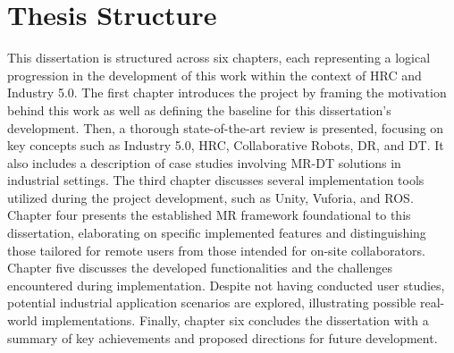 \section{Thesis Structure}
% 

This dissertation is structured across six chapters, each representing a logical progression in the development of this work within the context of \ac{HRC} and Industry 5.0. The first chapter introduces the project by framing the motivation behind this work as well as defining the baseline for this dissertation's development. Then, a thorough state-of-the-art review is presented, focusing on key concepts such as Industry 5.0, \ac{HRC}, Collaborative Robots, \ac{DR}, and \ac{DT}. It also includes a description of case studies involving \ac{MR}-\ac{DT} solutions in industrial settings. The third chapter discusses several implementation tools utilized during the project development, such as Unity, Vuforia, and \ac{ROS}. Chapter four presents the established \ac{MR} framework foundational to this dissertation, elaborating on specific implemented features and distinguishing those tailored for remote users from those intended for on-site collaborators. Chapter five discusses the developed functionalities and the challenges encountered during implementation. Despite not having conducted user studies, potential industrial application scenarios are explored, illustrating possible real-world implementations. Finally, chapter six concludes the dissertation with a summary of key achievements and proposed directions for future development.




